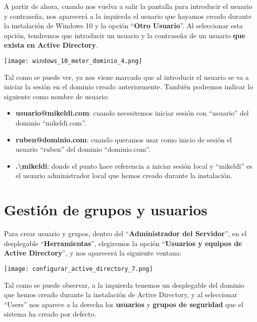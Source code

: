 A partir de ahora, cuando nos vuelva a salir la pantalla para introducir el usuario y contraseña, nos aparecerá a la izquierda el usuario que hayamos creado durante la instalación de Windows 10 y la opción “\textbf{Otro Usuario}”. Al seleccionar esta opción, tendremos que introducir un usuario y la contraseña de un usuario \textbf{que exista en Active Directory}.

\begin{center}
    \vspace{-20pt}
    \texttt{[image: windows\_10\_meter\_dominio\_4.png]}
    \vspace{-20pt}
\end{center}

Tal como se puede ver, ya nos viene marcado que al introducir el usuario se va a iniciar la sesión en el dominio creado anteriormente. También podremos indicar lo siguiente como nombre de usuario:

\begin{itemize}
    \item \textbf{usuario@mikeldi.com}: cuando necesitemos iniciar sesión con “usuario” del dominio “mikeldi.com”.
    \item \textbf{ruben@dominio.com}: cuando queramos usar como inicio de sesión el usuario “ruben” del dominio “dominio.com”.
    \item \textbf{.\textbackslash{mikeldi}}: donde el punto hace referencia a iniciar sesión local y “mikeldi” es el usuario administrador local que hemos creado durante la instalación.
\end{itemize}

\chapter{Gestión de grupos y usuarios}
Para crear usuario y grupos, dentro del “\textbf{Administrador del Servidor}”, en el desplegable “\textbf{Herramientas}”, elegiremos la opción “\textbf{Usuarios y equipos de Active Directory}”, y nos aparecerá la siguiente ventana:

\begin{center}
    \vspace{-15pt}
    \texttt{[image: configurar\_active\_directory\_7.png]}
    \vspace{-20pt}
\end{center}

Tal como se puede observar, a la izquierda tenemos un desplegable del dominio que hemos creado durante la instalación de Active Directory, y al seleccionar “Users” nos aparece a la derecha los \textbf{usuarios}  y \textbf{grupos de seguridad} que el sistema ha creado por defecto.

